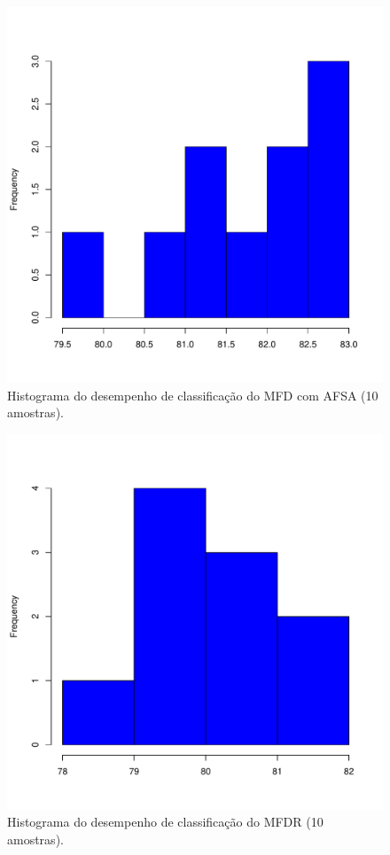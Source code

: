 \documentclass[conference]{IEEEtran}
\begin{document}
\begin{figure}[h]
	\centering
	\includegraphics[width=\linewidth]{img/bluehist_afsa_mfd.pdf}
	\caption{Histograma do desempenho de classificação do MFD com AFSA (10 amostras).}
	\label{fig:hist_afsa_mfd}
\end{figure}

\begin{figure}[h]
	\centering
	\includegraphics[width=\linewidth]{img/bluehist_mfdr.pdf}
	\caption{Histograma do desempenho de classificação do MFDR (10 amostras).}
	\label{fig:hist_mfdr}
\end{figure}
\end{document}
